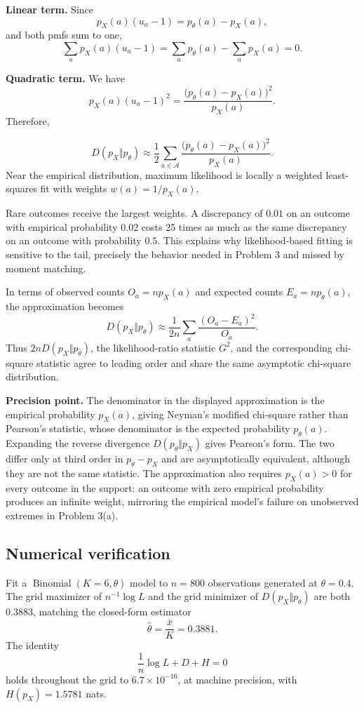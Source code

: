 \documentclass[11pt,letterpaper]{article}
\begin{document}
\textbf{Linear term.} Since
\[
  p_X(a)(u_a-1)=p_\theta(a)-p_X(a),
\]
and both pmfs sum to one,
\[
  \sum_a p_X(a)(u_a-1)
  =\sum_a p_\theta(a)-\sum_a p_X(a)=0.
\]

\textbf{Quadratic term.} We have
\[
  p_X(a)(u_a-1)^2
  =\frac{\bigl(p_\theta(a)-p_X(a)\bigr)^2}{p_X(a)}.
\]
Therefore,
\begin{resultbox}
\[
  \boxed{
  D(p_X\Vert p_\theta)
  \approx\frac12\sum_{a\in\mathcal A}
  \frac{\bigl(p_\theta(a)-p_X(a)\bigr)^2}{p_X(a)}.}
\]
Near the empirical distribution, maximum likelihood is locally a weighted least-squares fit with weights $w(a)=1/p_X(a)$.
\end{resultbox}

Rare outcomes receive the largest weights. A discrepancy of $0.01$ on an outcome with empirical probability $0.02$ costs 25 times as much as the same discrepancy on an outcome with probability $0.5$. This explains why likelihood-based fitting is sensitive to the tail, precisely the behavior needed in Problem 3 and missed by moment matching.

In terms of observed counts $O_a=np_X(a)$ and expected counts $E_a=np_\theta(a)$, the approximation becomes
\[
  D(p_X\Vert p_\theta)
  \approx\frac{1}{2n}\sum_a\frac{(O_a-E_a)^2}{O_a}.
\]
Thus $2nD(p_X\Vert p_{\widehat\theta})$, the likelihood-ratio statistic $G^2$, and the corresponding chi-square statistic agree to leading order and share the same asymptotic chi-square distribution.

\textbf{Precision point.} The denominator in the displayed approximation is the empirical probability $p_X(a)$, giving Neyman's modified chi-square rather than Pearson's statistic, whose denominator is the expected probability $p_\theta(a)$. Expanding the reverse divergence $D(p_\theta\Vert p_X)$ gives Pearson's form. The two differ only at third order in $p_\theta-p_X$ and are asymptotically equivalent, although they are not the same statistic. The approximation also requires $p_X(a)>0$ for every outcome in the support: an outcome with zero empirical probability produces an infinite weight, mirroring the empirical model's failure on unobserved extremes in Problem 3(a).

\subsection*{Numerical verification}

Fit a $\operatorname{Binomial}(K=6,\theta)$ model to $n=800$ observations generated at $\theta=0.4$. The grid maximizer of $n^{-1}\log L$ and the grid minimizer of $D(p_X\Vert p_\theta)$ are both $0.3883$, matching the closed-form estimator
\[
  \widehat\theta=\frac{\overline x}{K}=0.3881.
\]
The identity
\[
  \frac1n\log L+D+H=0
\]
holds throughout the grid to $6.7\times10^{-16}$, at machine precision, with $H(p_X)=1.5781$ nats.
\end{document}
